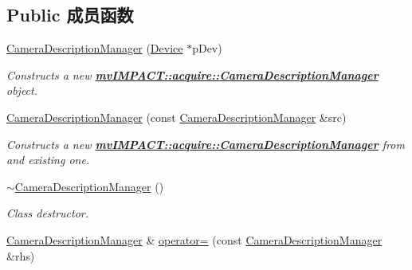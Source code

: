 \subsection*{Public 成员函数}
\begin{DoxyCompactItemize}
\item 
\hyperlink{classmv_i_m_p_a_c_t_1_1acquire_1_1_camera_description_manager_aa13872274650dd27f2b13fcb2463e5d8}{Camera\+Description\+Manager} (\hyperlink{classmv_i_m_p_a_c_t_1_1acquire_1_1_device}{Device} $\ast$p\+Dev)
\begin{DoxyCompactList}\small\item\em Constructs a new {\bfseries \hyperlink{classmv_i_m_p_a_c_t_1_1acquire_1_1_camera_description_manager}{mv\+I\+M\+P\+A\+C\+T\+::acquire\+::\+Camera\+Description\+Manager}} object. \end{DoxyCompactList}\item 
\hyperlink{classmv_i_m_p_a_c_t_1_1acquire_1_1_camera_description_manager_ae121412942e6b15854f5db73c39db0c9}{Camera\+Description\+Manager} (const \hyperlink{classmv_i_m_p_a_c_t_1_1acquire_1_1_camera_description_manager}{Camera\+Description\+Manager} \&src)
\begin{DoxyCompactList}\small\item\em Constructs a new {\bfseries \hyperlink{classmv_i_m_p_a_c_t_1_1acquire_1_1_camera_description_manager}{mv\+I\+M\+P\+A\+C\+T\+::acquire\+::\+Camera\+Description\+Manager}} from and existing one. \end{DoxyCompactList}\item 
\hypertarget{classmv_i_m_p_a_c_t_1_1acquire_1_1_camera_description_manager_a4a58366e0591e3590576b4156e36729b}{\hyperlink{classmv_i_m_p_a_c_t_1_1acquire_1_1_camera_description_manager_a4a58366e0591e3590576b4156e36729b}{$\sim$\+Camera\+Description\+Manager} ()}\label{classmv_i_m_p_a_c_t_1_1acquire_1_1_camera_description_manager_a4a58366e0591e3590576b4156e36729b}

\begin{DoxyCompactList}\small\item\em Class destructor. \end{DoxyCompactList}\item 
\hypertarget{classmv_i_m_p_a_c_t_1_1acquire_1_1_camera_description_manager_a599f16571bdb33271660a4d5a701e7b9}{\hyperlink{classmv_i_m_p_a_c_t_1_1acquire_1_1_camera_description_manager}{Camera\+Description\+Manager} \& \hyperlink{classmv_i_m_p_a_c_t_1_1acquire_1_1_camera_description_manager_a599f16571bdb33271660a4d5a701e7b9}{operator=} (const \hyperlink{classmv_i_m_p_a_c_t_1_1acquire_1_1_camera_description_manager}{Camera\+Description\+Manager} \&rhs)}\label{classmv_i_m_p_a_c_t_1_1acquire_1_1_camera_description_manager_a599f16571bdb33271660a4d5a701e7b9}


\end{DoxyCompactItemize}
